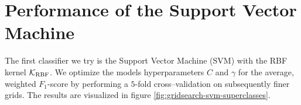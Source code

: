 \section{Performance of the Support Vector Machine}

The first classifier we try is the Support Vector Machine (SVM) with the RBF kernel $\mathcal{K}_{\text{RBF}}$. We optimize the models hyperparameters $C$ and $\gamma$ for the average, weighted $F_1$-score by performing a $5$-fold cross--validation on subsequently finer grids. The results are visualized in figure \ref{fig:gridsearch-svm-superclasses}.

\begin{figure}[H]
\hfill
{}
\hfill
{}

\end{figure}

